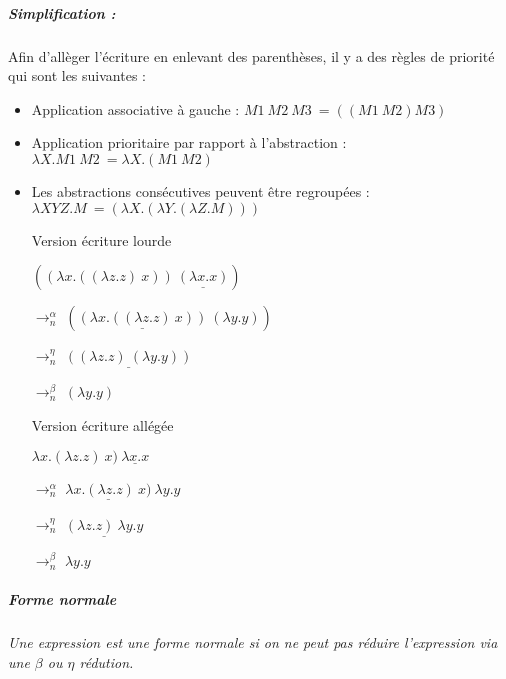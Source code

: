 \documentclass[10pt,a4paper]{article}
\begin{document}
				
				
				\subparagraph{Simplification :} Afin d'allèger l'écriture en enlevant des parenthèses, il y a des règles de priorité qui sont les suivantes :
				\begin{itemize}
					\item Application associative à gauche : $M1~M2~M3~= ((M1~M2)M3)$
					\item Application prioritaire par rapport à l'abstraction : $\lambda X.M1~M2~= \lambda X.(M1~M2)$
					\item Les abstractions consécutives peuvent être regroupées : $\lambda XYZ.M~= (\lambda X.(\lambda Y.(\lambda Z.M)))$
				\end{itemize}
				\medbreak
				
				\begin{multicols}{2}{
					\begin{itemize}
						\item[] Version écriture lourde
						\item[] $((\lambda x.((\lambda z.z)~x))~\underline{(\lambda x.x)})$
						\item[$\rightarrow_{n}^{\alpha}$] $(\underline{(\lambda x.((\lambda z.z)~x))}~(\lambda y.y))$
						\item[$\rightarrow_{n}^{\eta}$] $\underline{((\lambda z.z)~(\lambda y.y))}$
						\item[$\rightarrow_{n}^{\beta}$] $(\lambda y.y)$
					\end{itemize}
				
					\begin{itemize}
						\item[] Version écriture allégée
						\item[] $\lambda x.(\lambda z.z)~x)~\underline{\lambda x.x}$
						\item[$\rightarrow_{n}^{\alpha}$] $\underline{\lambda x.(\lambda z.z)~x)}~\lambda y.y$
						\item[$\rightarrow_{n}^{\eta}$] $\underline{(\lambda z.z)~\lambda y.y}$
						\item[$\rightarrow_{n}^{\beta}$] $\lambda y.y$
					\end{itemize}
				}
				\end{multicols}
				\bigbreak
				
				
				\subparagraph{Forme normale}
			
				\textit{Une expression est une forme normale si on ne peut pas réduire l'expression via une $\beta$ ou $\eta$ rédution.}
				\medbreak
			
\end{document}
